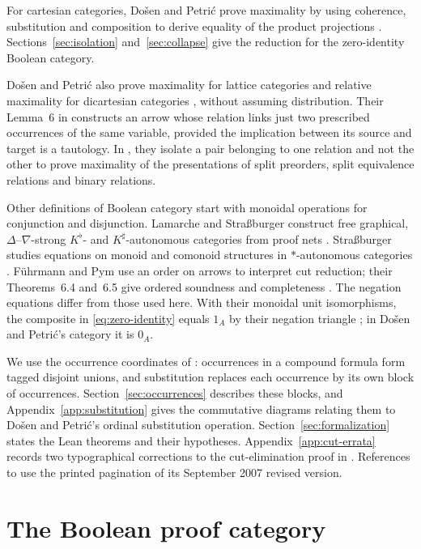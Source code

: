 \documentclass[11pt]{article}
\begin{document}
For cartesian categories, Do\v{s}en and Petri\'c prove maximality by
using coherence, substitution and composition to derive equality of
the product projections \cite[\S5]{DPCartesian}.
Sections~\ref{sec:isolation} and~\ref{sec:collapse} give the reduction
for the zero-identity Boolean category.

Do\v{s}en and Petri\'c also prove maximality for lattice categories
and relative maximality for dicartesian categories
\cite[\S\S8--10]{DPBicartesian}, without assuming distribution.
Their Lemma~6 in \cite{DPIsomorphic} constructs an arrow whose
relation links just two prescribed occurrences of the same variable,
provided the implication between its source and target is a tautology.
In \cite[\S16]{DPSplit}, they isolate a pair belonging to one relation
and not the other to prove maximality of the presentations of split
preorders, split equivalence relations and binary relations.

Other definitions of Boolean category start with monoidal operations
for conjunction and disjunction. Lamarche and Stra{\ss}burger
construct free graphical, $\Delta$--$\nabla$-strong
$K^\flat$- and $K^\sharp$-autonomous categories from proof nets \cite[Theorem~3.5.4]{LSFree}.
Stra{\ss}burger studies equations on monoid and comonoid structures
in $*$-autonomous categories \cite{Strassburger}.
F\"uhrmann and Pym use an order on arrows to interpret cut reduction;
their Theorems~6.4 and~6.5 give ordered soundness and completeness
\cite{FP}. The negation equations differ from those used here.
With their monoidal unit isomorphisms, the composite in
\eqref{eq:zero-identity} equals $1_A$ by their negation triangle
\cite[(11)]{FP}; in Do\v{s}en and Petri\'c's category it is $0_A$.

We use the occurrence coordinates of \cite[\S9]{Notation}: occurrences
in a compound formula form tagged disjoint unions, and substitution
replaces each occurrence by its own block of occurrences.
Section~\ref{sec:occurrences} describes these blocks, and
Appendix~\ref{app:substitution} gives the commutative diagrams relating
them to Do\v{s}en and Petri\'c's ordinal substitution operation.
Section~\ref{sec:formalization} states the Lean theorems and their
hypotheses.
Appendix~\ref{app:cut-errata} records two typographical corrections to the
cut-elimination proof in \cite{DP}.
References to \cite{DP} use the printed
pagination of its September 2007 revised version.

\section{The Boolean proof category}\label{sec:category}
\end{document}
